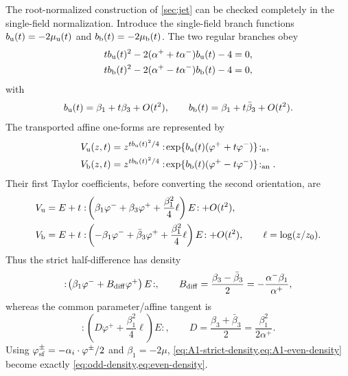\documentclass[11pt,a4paper]{article}
\numberwithin{equation}{section}
\theoremstyle{remark}
\begin{document}
The root-normalized construction of \cref{sec:jet} can be checked completely in the
single-field normalization.  Introduce the single-field branch functions
$b_{\rm u}(t)=-2\mu_{\rm u}(t)$ and $b_{\rm b}(t)=-2\mu_{\rm b}(t)$.  The two regular branches obey
\begin{align}
 t b_{\rm u}(t)^2-2(\alpha^++t\alpha^-)b_{\rm u}(t)-4&=0,
 \nonumber\\
 t b_{\rm b}(t)^2-2(\alpha^+-t\alpha^-)b_{\rm b}(t)-4&=0,
 \label{eq:A1-exact-branches}
\end{align}
with
\begin{equation}
 b_{\rm u}(t)=\beta_1+t\beta_3+O(t^2),\qquad
 b_{\rm b}(t)=\beta_1+t\bar\beta_3+O(t^2).
 \label{eq:A1-branch-expansions}
\end{equation}
The transported affine one-forms are represented by
\begin{align}
 V_{\rm u}(z,t)&=z^{t b_{\rm u}(t)^2/4}
 :\!\exp\{b_{\rm u}(t)(\varphi^++t\varphi^-)\}\!:_{\rm n},
 \label{eq:A1-unbarred-vertex}\\
 V_{\rm b}(z,t)&=z^{t b_{\rm b}(t)^2/4}
 :\!\exp\{b_{\rm b}(t)(\varphi^+-t\varphi^-)\}\!:_{\rm an}.
 \label{eq:A1-barred-vertex}
\end{align}
Their first Taylor coefficients, before converting the second orientation, are
\begin{align}
 V_{\rm u}&=E+t:\!\left(\beta_1\varphi^-+\beta_3\varphi^+
 +\frac{\beta_1^2}{4}\ell\right)E\!:+O(t^2),
 \nonumber\\
 V_{\rm b}&=E+t:\!\left(-\beta_1\varphi^-+\bar\beta_3\varphi^+
 +\frac{\beta_1^2}{4}\ell\right)E\!:+O(t^2),
 \qquad \ell=\log(z/z_0).
 \label{eq:A1-vertex-expansions}
\end{align}
Thus the strict half-difference has density
\begin{equation}
 :\!\left(\beta_1\varphi^-+B_{\rm diff}\varphi^+\right)E\!:,
 \qquad B_{\rm diff}=\frac{\beta_3-\bar\beta_3}{2}
 =-\frac{\alpha^-\beta_1}{\alpha^+},
 \label{eq:A1-strict-density}
\end{equation}
whereas the common parameter/affine tangent is
\begin{equation}
 :\!\left(D\varphi^++\frac{\beta_1^2}{4}\ell\right)E\!:,
 \qquad D=\frac{\beta_3+\bar\beta_3}{2}
 =\frac{\beta_1^2}{2\alpha^+}.
 \label{eq:A1-even-density}
\end{equation}
Using $\varphi_{\rm sf}^{\pm}=-\alpha_i\cdot\varphi^{\pm}/2$ and
$\beta_1=-2\mu$, \cref{eq:A1-strict-density,eq:A1-even-density} become exactly
\cref{eq:odd-density,eq:even-density}.
\end{document}

